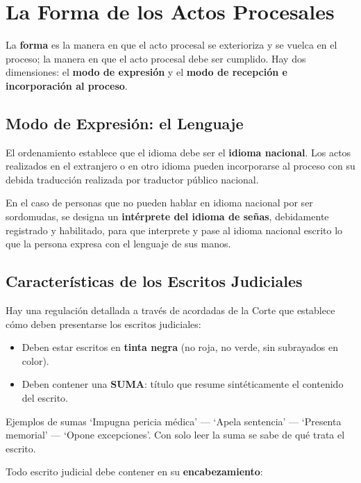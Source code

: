 \documentclass[12pt,oneside]{book}
\begin{document}
\section{La Forma de los Actos Procesales}

La \textbf{forma} es la manera en que el acto procesal se exterioriza y se vuelca en el proceso; la manera en que el acto procesal debe ser cumplido. Hay dos dimensiones: el \textbf{modo de expresión} y el \textbf{modo de recepción e incorporación al proceso}.

\subsection{Modo de Expresión: el Lenguaje}

El ordenamiento establece que el idioma debe ser el \textbf{idioma nacional}. Los actos realizados en el extranjero o en otro idioma pueden incorporarse al proceso con su debida traducción realizada por traductor público nacional.

En el caso de personas que no pueden hablar en idioma nacional por ser sordomudas, se designa un \textbf{intérprete del idioma de señas}, debidamente registrado y habilitado, para que interprete y pase al idioma nacional escrito lo que la persona expresa con el lenguaje de sus manos.

\subsection{Características de los Escritos Judiciales}

Hay una regulación detallada a través de acordadas de la Corte que establece cómo deben presentarse los escritos judiciales:

\begin{itemize}
    \item Deben estar escritos en \textbf{tinta negra} (no roja, no verde, sin subrayados en color).
    \item Deben contener una \textbf{SUMA}: título que resume sintéticamente el contenido del escrito.
\end{itemize}

\begin{example}{Ejemplos de sumas}
`Impugna pericia médica' --- `Apela sentencia' --- `Presenta memorial' --- `Opone excepciones'. Con solo leer la suma se sabe de qué trata el escrito.
\end{example}

Todo escrito judicial debe contener en su \textbf{encabezamiento}:
\end{document}
